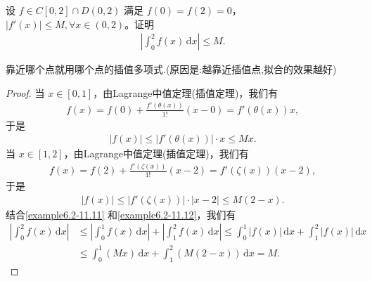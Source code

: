 \documentclass[../../main.tex]{subfiles}
\begin{document}
\begin{example}
设 $f \in C[0,2] \cap D(0,2)$ 满足 $f(0) = f(2) = 0$，$|f'(x)| \leq M, \forall x \in (0,2)$。证明
\begin{align*}
\left| \int_{0}^{2} f(x) \, \mathrm{d}x \right| \leq M.
\end{align*}
\end{example}
\begin{note}
靠近哪个点就用哪个点的插值多项式.(原因是:越靠近插值点,拟合的效果越好)
\end{note}
\begin{proof}
当 $x \in [0,1]$，由Lagrange中值定理(插值定理)，我们有
\begin{align*}
f(x) = f(0) + \frac{f'(\theta(x))}{1!} (x - 0) = f'(\theta(x)) x,
\end{align*}
于是
\begin{align}
|f(x)| \leq |f'(\theta(x))| \cdot x \leq Mx.\label{example6.2-11.11}
\end{align}
当 $x \in [1,2]$，由Lagrange中值定理(插值定理)，我们有
\begin{align*}
f(x) = f(2) + \frac{f'(\zeta(x))}{1!} (x - 2) = f'(\zeta(x)) (x - 2),
\end{align*}
于是
\begin{align}
|f(x)| \leq |f'(\zeta(x))| \cdot |x - 2| \leq M(2 - x).\label{example6.2-11.12}
\end{align}
结合\eqref{example6.2-11.11} 和\eqref{example6.2-11.12}，我们有
\begin{align*}
\left| \int_{0}^{2} f(x) \, \mathrm{d}x \right| &\leq \left| \int_{0}^{1} f(x) \, \mathrm{d}x \right| + \left| \int_{1}^{2} f(x) \, \mathrm{d}x \right| 
\leq \int_{0}^{1} |f(x)| \, \mathrm{d}x + \int_{1}^{2} |f(x)| \, \mathrm{d}x \\
&\leq \int_{0}^{1} (Mx) \, \mathrm{d}x + \int_{1}^{2} (M(2 - x)) \, \mathrm{d}x 
= M.
\end{align*}
\end{proof}
\end{document}
